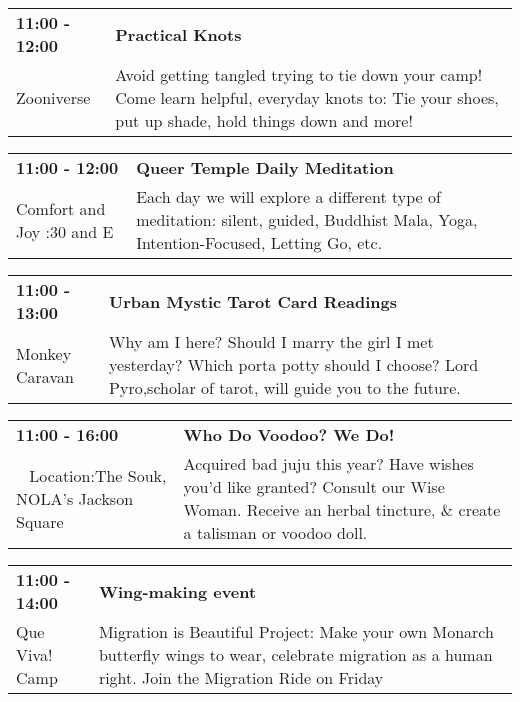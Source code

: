 \begin{tabular}{ p{1in} p{2.2in} }
    \textbf{11:00 - 12:00} & \textbf{Practical Knots} \\
    Zooniverse \newline  & Avoid getting tangled trying to tie down your camp! Come learn helpful, everyday knots to: Tie your shoes, put up shade, hold things down and more! \\
    \hline 
\end{tabular}
    
\begin{tabular}{ p{1in} p{2.2in} }
    \textbf{11:00 - 12:00} & \textbf{Queer Temple Daily Meditation} \\
    Comfort and Joy \newline 7:30 and E & Each day we will explore a different type of meditation: silent, guided, Buddhist Mala, Yoga, Intention-Focused, Letting Go, etc. \\
    \hline 
\end{tabular}
    
\begin{tabular}{ p{1in} p{2.2in} }
    \textbf{11:00 - 13:00} & \textbf{Urban Mystic Tarot Card Readings} \\
    Monkey Caravan \newline  & Why am I here? Should I marry the girl I met yesterday? Which porta potty should I choose? Lord Pyro,scholar of tarot, will guide you to the future. \\
    \hline 
\end{tabular}
    
\begin{tabular}{ p{1in} p{2.2in} }
    \textbf{11:00 - 16:00} & \textbf{Who Do Voodoo? We Do!} \\
    ~ \newline Location:The Souk, NOLA's Jackson Square  & Acquired bad juju this year? Have wishes you'd like granted? Consult our Wise Woman. Receive an herbal tincture, \& create a talisman or voodoo doll. \\
    \hline 
\end{tabular}
    
\begin{tabular}{ p{1in} p{2.2in} }
    \textbf{11:00 - 14:00} & \textbf{Wing-making event} \\
    Que Viva! Camp \newline  & Migration is Beautiful Project: Make your own Monarch butterfly wings to wear, celebrate migration as a human right. Join the Migration Ride on Friday \\
    \hline 
\end{tabular}
    
